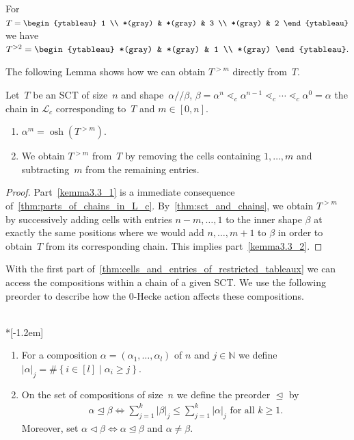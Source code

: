 \documentclass[ALCO,ThmDefs,Unicode,epreuves]{cedram}
\newcommand{\N}{\mathbb N}
\DeclareMathOperator{\osh}{osh}
\newcommand{\ab}{{\alpha / \! \! / \beta}}
\newcommand{\parts}[2]{{(#1_1, \ldots, #1_{#2})}}
\newcommand{\dleq}{\trianglelefteq}
\newcommand{\dlneq}{\vartriangleleft}
\begin{document}
\begin{exam}
	For 
	$T=\begin{ytableau}
	1 \\
	*(gray) & *(gray) & 3 \\
	*(gray) & 2
	\end{ytableau}$ 
	we have
	$ 
	T^{>2} = \begin{ytableau} 
	*(gray) & *(gray) & 1 \\
	*(gray) \end{ytableau}.
	$	
\end{exam}

The following Lemma shows how we can obtain $T^{>m}$ directly from~$T$.

\begin{lemma}
	\label{thm:cells_and_entries_of_restricted_tableaux}
	Let~$T$ be an SCT of size~$n$ and shape~$\ab$, $\beta = \alpha^n \lessdot_c \alpha^{n-1} \lessdot_c \cdots \lessdot_c \alpha^0 = \alpha$ the chain in $\mathcal{L}_c$ corresponding to~$T$ and $m\in [0,n]$.
	\begin{enumerate}
		\item\label{kemma3.3_1}	
		$\alpha^m = \osh(T^{>m})$.
		\item\label{kemma3.3_2} We obtain $T^{>m}$ from~$T$ by removing the cells containing $1,\dots, m$ and subtracting~$m$ from the remaining entries.
	\end{enumerate}
\end{lemma}

	\begin{proof}
		Part~\eqref{kemma3.3_1} is a immediate consequence of~\cref{thm:parts_of_chains_in_L_c}. 	
		By~\cref{thm:sct_and_chains}, we obtain $T^{>m}$ by successively adding cells with entries $n-m,\dots, 1$ to the inner shape $\beta$ at exactly the same positions where we would add $n,\dots, m+1$ to $\beta$ in order to obtain~$T$ from its corresponding chain. This implies part~\eqref{kemma3.3_2}.
	\end{proof}

With the first part of~\cref{thm:cells_and_entries_of_restricted_tableaux} we can access the compositions within a chain of a given SCT. We use the following preorder to describe how the 0-Hecke action affects these compositions.

\begin{defi}\ \\*[-1.2em]

	\begin{enumerate}
		\item For a composition $\alpha = \parts{\alpha}{l}$ of $n$ and $j\in \N$ we define $|\alpha|_j = \# \left\{ i \in [l] \mid \alpha_i\geq j \right\}$. 
		\item
		 On the set of compositions of size~$n$ we define the preorder $\dleq$ by
		\begin{align*}
			\alpha \dleq \beta \iff \sum_{j=1}^k |\beta|_j \leq \sum_{j=1}^k |\alpha|_j \text{ for all $k \geq 1$.}
		\end{align*} 
		 Moreover, set $\alpha \dlneq \beta \iff \alpha \dleq \beta$ and $\alpha \neq \beta$.
	\end{enumerate}
\end{defi}
\end{document}
